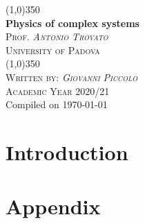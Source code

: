 \documentclass[12pt,a4paper]{report} %
\begin{document}
\begin{center}
                \line (1,0){350} \\
                \huge{\bfseries Physics of complex systems}\\
                [2mm]
                \textsc{\normalsize Prof. \textit{Antonio Trovato}}
                \vspace{-0.5em}\\
                \textsc{\normalsize University of Padova}\\
                \vspace{-1em}
                \line (1,0){350} \\
        [0.2cm]
        \textsc{\normalsize Written by: \textit{Giovanni Piccolo}}\\
                \textsc{\normalsize Academic Year 2020/21}\\ 
        {\scriptsize Compiled on \today}\\
        [0.2cm]
        {\scriptsize \doclicenseLongText}
\end{center}


\tableofcontents 
\clearpage
\restoregeometry

\chapter{Introduction}
\chapter{Appendix}



\printindex
\end{document}
